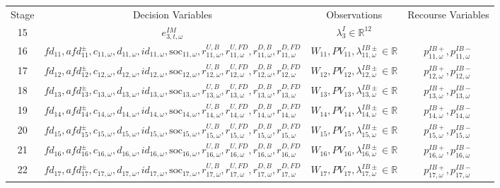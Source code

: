 \documentclass{article}
\newcommand{\R}{\mathbb{R}}
\newcommand{\soc}{\text{soc}}
\begin{document}
\begin{table}
\begin{tabular}{c c c c}
	Stage & Decision Variables & Observations & Recourse Variables \\
    15 & $e^{IM}_{3, t, \omega}$ & $\lambda^I_3 \in \R^{12}$ &  \\
	16 & $fd_{11}, afd^{\pm}_{11}, c_{11, \omega}, d_{11, \omega}, id_{11, \omega}, \soc_{11, \omega}, r^{U, B}_{11, \omega}, r^{U, FD}_{11, \omega}, r^{D, B}_{11, \omega}, r^{D, FD}_{11, \omega}$ & $W_{11}, PV_{11}, \lambda^{IB\pm}_{11, \omega} \in \R$ & $p^{IB+}_{11, \omega}, p^{IB-}_{11, \omega}$ \\
	17 & $fd_{12}, afd^{\pm}_{12}, c_{12, \omega}, d_{12, \omega}, id_{12, \omega}, \soc_{12, \omega}, r^{U, B}_{12, \omega}, r^{U, FD}_{12, \omega}, r^{D, B}_{12, \omega}, r^{D, FD}_{12, \omega}$ & $W_{12}, PV_{12}, \lambda^{IB\pm}_{12, \omega} \in \R$ & $p^{IB+}_{12, \omega}, p^{IB-}_{12, \omega}$ \\
	18 & $fd_{13}, afd^{\pm}_{13}, c_{13, \omega}, d_{13, \omega}, id_{13, \omega}, \soc_{13, \omega}, r^{U, B}_{13, \omega}, r^{U, FD}_{13, \omega}, r^{D, B}_{13, \omega}, r^{D, FD}_{13, \omega}$ & $W_{13}, PV_{13}, \lambda^{IB\pm}_{13, \omega} \in \R$ & $p^{IB+}_{13, \omega}, p^{IB-}_{13, \omega}$ \\
	19 & $fd_{14}, afd^{\pm}_{14}, c_{14, \omega}, d_{14, \omega}, id_{14, \omega}, \soc_{14, \omega}, r^{U, B}_{14, \omega}, r^{U, FD}_{14, \omega}, r^{D, B}_{14, \omega}, r^{D, FD}_{14, \omega}$ & $W_{14}, PV_{14}, \lambda^{IB\pm}_{14, \omega} \in \R$ & $p^{IB+}_{14, \omega}, p^{IB-}_{14, \omega}$ \\
	20 & $fd_{15}, afd^{\pm}_{15}, c_{15, \omega}, d_{15, \omega}, id_{15, \omega}, \soc_{15, \omega}, r^{U, B}_{15, \omega}, r^{U, FD}_{15, \omega}, r^{D, B}_{15, \omega}, r^{D, FD}_{15, \omega}$ & $W_{15}, PV_{15}, \lambda^{IB\pm}_{15, \omega} \in \R$ & $p^{IB+}_{15, \omega}, p^{IB-}_{15, \omega}$ \\
	21 & $fd_{16}, afd^{\pm}_{16}, c_{16, \omega}, d_{16, \omega}, id_{16, \omega}, \soc_{16, \omega}, r^{U, B}_{16, \omega}, r^{U, FD}_{16, \omega}, r^{D, B}_{16, \omega}, r^{D, FD}_{16, \omega}$ & $W_{16}, PV_{16}, \lambda^{IB\pm}_{16, \omega} \in \R$ & $p^{IB+}_{16, \omega}, p^{IB-}_{16, \omega}$ \\
	22 & $fd_{17}, afd^{\pm}_{17}, c_{17, \omega}, d_{17, \omega}, id_{17, \omega}, \soc_{17, \omega}, r^{U, B}_{17, \omega}, r^{U, FD}_{17, \omega}, r^{D, B}_{17, \omega}, r^{D, FD}_{17, \omega}$ & $W_{17}, PV_{17}, \lambda^{IB\pm}_{17, \omega} \in \R$ & $p^{IB+}_{17, \omega}, p^{IB-}_{17, \omega}$ \\

\end{tabular}
\end{table}
\end{document}
